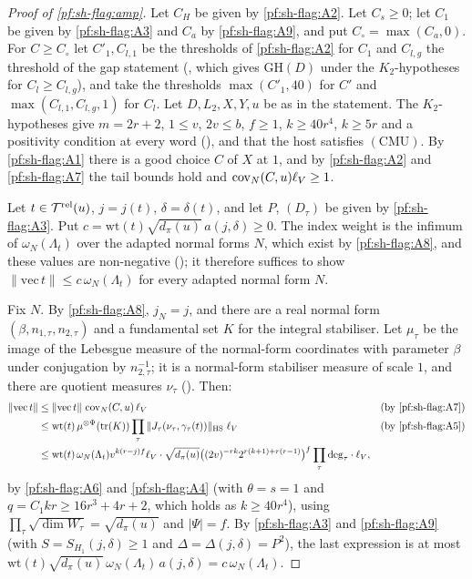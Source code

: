 \begin{proof}[Proof of \cref{pf:sh-flag:amp}]
Let $C_H$ be given by \ref{pf:sh-flag:A2}. Let $C_s\ge0$; let $C_1$ be given by \ref{pf:sh-flag:A3} and $C_a$ by \ref{pf:sh-flag:A9},
and put $C_\circ=\max(C_a,0)$. For $C\ge C_\circ$ let $C'_1,C_{l,1}$ be the thresholds of \ref{pf:sh-flag:A2} for $C_1$
and $C_{l,g}$ the threshold of the gap statement (, which gives $\mathrm{GH}(D)$ under the
$K_2$-hypotheses for $C_l\ge C_{l,g}$), and take the thresholds $\max(C'_1,40)$ for $C'$ and $\max(C_{l,1},C_{l,g},1)$ for $C_l$. Let $D,L_2,X,Y,u$ be as in the statement. The $K_2$-hypotheses give $m=2r+2$, $1\le v$, $2v\le b$,
$f\ge1$, $k\ge40r^4$, $k\ge5r$ and a positivity condition at every word (), and that
the host satisfies $(\mathrm{CMU})$. By \ref{pf:sh-flag:A1} there is a good choice $C$ of $X$ at $1$, and by \ref{pf:sh-flag:A2} and
\ref{pf:sh-flag:A7} the tail bounds hold and $\operatorname{cov}_N(C,u)\ell_V\ge1$.

Let $t\in\mathcal T^{\mathrm{rel}}(u)$, $j=j(t)$, $\delta=\delta(t)$, and let $P$, $(D_\tau)$ be given by \ref{pf:sh-flag:A3}. Put
$c=\mathrm{wt}(t)\sqrt{d_\pi(u)}\,a(j,\delta)\ge0$. The index weight is the infimum of $\omega_N(\Lambda_t)$ over the adapted normal forms
$N$, which exist by \ref{pf:sh-flag:A8}, and these values are non-negative
(); it therefore suffices to show $\|\mathrm{vec}\,t\|\le c\,\omega_N(\Lambda_t)$ for every
adapted normal form $N$.

Fix $N$. By \ref{pf:sh-flag:A8}, $j_N=j$, and there are a real normal form $(\beta,n_{1,\tau},n_{2,\tau})$ and a fundamental set $K$ for
the integral stabiliser. Let $\mu_\tau$ be the image of the Lebesgue measure of the normal-form coordinates with parameter
$\beta$ under conjugation by $n_{2,\tau}^{-1}$; it is a normal-form stabiliser measure of scale $1$, and there are quotient measures
$\nu_\tau$ (). Then:
\begin{align*}
\|\mathrm{vec}\,t\|&\le\|\mathrm{vec}\,t\|\,\operatorname{cov}_N(C,u)\,\ell_V&&\text{(by \ref{pf:sh-flag:A7})}\\
&\le\mathrm{wt}(t)\,\mu^{\otimes\Psi}(\mathrm{tr}(K))\prod_\tau\|J_\tau(\nu_\tau,\gamma_\tau(t))\|_{\mathrm{HS}}\;\ell_V&&\text{(by \ref{pf:sh-flag:A5})}\\
&\le\mathrm{wt}(t)\,\omega_N(\Lambda_t)v^{k(r-j)f}\ell_V\cdot\sqrt{d_\pi(u)}\bigl((2v)^{-rk}2^{r(k+1)+r(r-1)}\bigr)^f
\prod_\tau\mathrm{deg}_\tau\cdot\ell_V,
\end{align*}
by \ref{pf:sh-flag:A6} and \ref{pf:sh-flag:A4} (with $\theta=s=1$ and $q=C_1kr\ge16r^3+4r+2$, which holds as $k\ge40r^4$), using
$\prod_\tau\sqrt{\dim W_\tau}=\sqrt{d_\pi(u)}$ and $|\Psi|=f$. By \ref{pf:sh-flag:A3} and \ref{pf:sh-flag:A9} (with $S=S_{H_1}(j,\delta)\ge1$
and $\Delta=\Delta(j,\delta)=P^2$), the last expression is at most $\mathrm{wt}(t)\sqrt{d_\pi(u)}\,\omega_N(\Lambda_t)\,a(j,\delta)=c\,\omega_N(\Lambda_t)$.
\end{proof}

